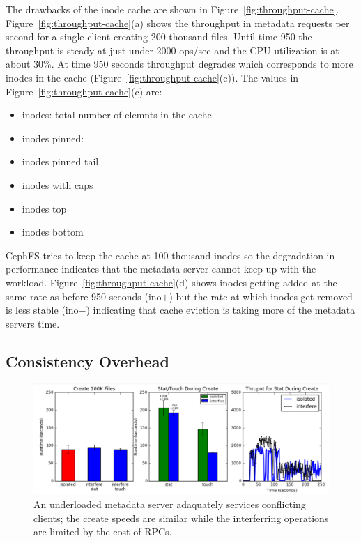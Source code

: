 
The drawbacks of the inode cache are shown in
Figure~\ref{fig:throughput-cache}.  Figure~\ref{fig:throughput-cache}(a) shows
the throughput in metadata requests per second for a single client creating 200
thousand files. Until time 950 the throughput is steady at just under 2000
ops/sec and the CPU utilization is at about 30\%. At time 950 seconds
throughput degrades which corresponds to more inodes in the cache
(Figure~\ref{fig:throughput-cache}(c)). The values in
Figure~\ref{fig:throughput-cache}(c) are:

\begin{itemize}
  \item inodes: total number of elemnts in the cache
  \item inodes pinned: 
  \item inodes pinned tail
  \item inodes with caps
  \item inodes top
  \item inodes bottom 
\end{itemize}

CephFS tries to keep the cache at 100 thousand inodes so the degradation in
performance indicates that the metadata server cannot keep up with the
workload. Figure~\ref{fig:throughput-cache}(d) shows inodes getting added at
the same rate as before 950 seconds (ino\(+\)) but the rate at which inodes get
removed is less stable (ino\(-\)) indicating that cache eviction is taking more
of the metadata servers time.

\subsection{Consistency Overhead}
\begin{figure}[tb]
\centering
\includegraphics[width=180mm]{figures/exp0-underloaded.png}
\caption{An underloaded metadata server adaquately services conflicting
clients; the create speeds are similar while the interferring operations are
limited by the cost of RPCs.}\label{fig:exp0-underloaded}
\end{figure}

